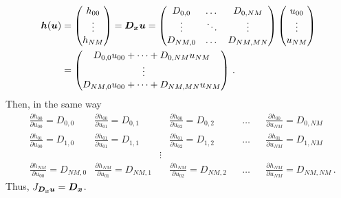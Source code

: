 \begin{equation*}
\begin{aligned}
  \bm{h}(\bm{u}) & =  
  \begin{pmatrix}
      h_{00} \\ \vdots \\ h_{NM} 
  \end{pmatrix}
  =
  \bm{D_x} \bm{u}
  = 
  \begin{pmatrix}
    D_{0,0} & \dots & D_{0,NM}
    \\
    \vdots  &\ddots & \vdots
    \\
    D_{NM,0} & \dots & D_{NM,MN}
  \end{pmatrix}
  \begin{pmatrix}
    u_{00} \\ \vdots \\u_{NM}
  \end{pmatrix}
  \\
  & = 
  \begin{pmatrix}
    D_{0,0}u_{00} + \dots + D_{0,NM}u_{NM}
    \\
    \ \vdots  \quad \quad 
    \\
    D_{NM,0} u_{00} + \dots + D_{NM,MN}u_{NM}
  \end{pmatrix}
  \, .
\end{aligned}
\end{equation*}
Then, in the same way
{\footnotesize
\begin{align*}
  &\frac{\partial h_{00}}{\partial u_{00}} = D_{0,0} %
  &\frac{\partial h_{00}}{\partial u_{01}} = D_{0,1} %
  &&\frac{\partial h_{00}}{\partial u_{02}} = D_{0,2} %
  &&\dots 
  &&\frac{\partial h_{00}}{\partial u_{NM}} = D_{0,NM} %
  \\
  &\frac{\partial h_{01}}{\partial u_{00}} = D_{1,0} %
  &\frac{\partial h_{01}}{\partial u_{01}} = D_{1,1} %
  &&\frac{\partial h_{01}}{\partial u_{02}} = D_{1,2} %
  &&\dots 
  &&\frac{\partial h_{01}}{\partial u_{NM}} = D_{1,NM} %
  \\
  & & & \vdots 
  \\
  &\frac{\partial h_{NM}}{\partial u_{00}} = D_{NM,0} %
  &\frac{\partial h_{NM}}{\partial u_{01}} = D_{NM,1} %
  &&\frac{\partial h_{NM}}{\partial u_{02}} = D_{NM,2} %
  &&\dots 
  &&\frac{\partial h_{NM}}{\partial u_{NM}} = D_{NM,NM} %
  \, .
\end{align*}
}
Thus, $J_{\bm{D_x}\bm{u}} = \bm{D_x}$.

